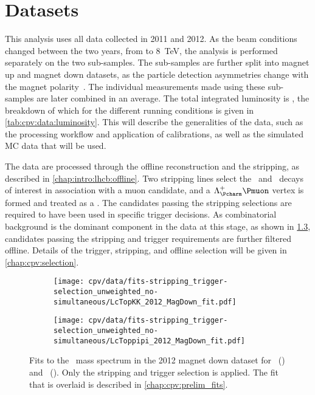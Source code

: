 \chapter{Datasets}
\label{chap:cpv:data}

This analysis uses all data collected in 2011 and 2012.
As the beam conditions changed between the two years, from  to 
\SI{8}{\TeV}, the analysis is performed separately on the two sub-samples.
The sub-samples are further split into magnet up and magnet down datasets, as 
the particle detection asymmetries change with the magnet 
polarity~\cite{Vesterinen:1642153}.
The individual measurements made using these sub-samples are later combined in 
an average.
The total integrated luminosity is \totlumi, the breakdown of which for the 
different running conditions is given in \cref{tab:cpv:data:luminosity}.
This  will describe the generalities of the data, 
such as the processing workflow and application of calibrations, as well as the 
simulated \ac{MC} data that will be used.

The data are processed through the offline reconstruction and the stripping, as 
described in \cref{chap:intro:lhcb:offline}.
Two stripping lines select the \LcTopKK\ and \LcToppipi\ decays of interest in 
association with a muon candidate, and a $\PLambdac\Pmuon$ vertex is formed and 
treated as a \PLambdab.
The candidates passing the stripping selections are required to have been used 
in specific trigger decisions.
As combinatorial background is the dominant component in the data at this 
stage, as shown in \cref{fig:cpv:data:mass}, candidates passing the stripping 
and trigger requirements are further filtered offline.
Details of the trigger, stripping, and offline selection will be given in 
\cref{chap:cpv:selection}.

\begin{figure}
  \begin{subfigure}[b]{0.5\textwidth}
    \texttt{[image: cpv/data/fits-stripping\_trigger-selection\_unweighted\_no-simultaneous/LcTopKK\_2012\_MagDown\_fit.pdf]}
    \caption{\pKK}
    \label{fig:cpv:data:mass:pKK}
  \end{subfigure}
  \begin{subfigure}[b]{0.5\textwidth}
    \texttt{[image: cpv/data/fits-stripping\_trigger-selection\_unweighted\_no-simultaneous/LcToppipi\_2012\_MagDown\_fit.pdf]}
    \caption{\ppipi}
    \label{fig:cpv:data:mass:ppipi}
  \end{subfigure}
  \caption{%
    Fits to the \PLambdac\ mass spectrum in the 2012 magnet down dataset for 
    \pKK\ () and \ppipi\ 
    ().
    Only the stripping and trigger selection is applied.
    The fit that is overlaid is described in \cref{chap:cpv:prelim_fits}.
  }
  \label{fig:cpv:data:mass}
\end{figure}

